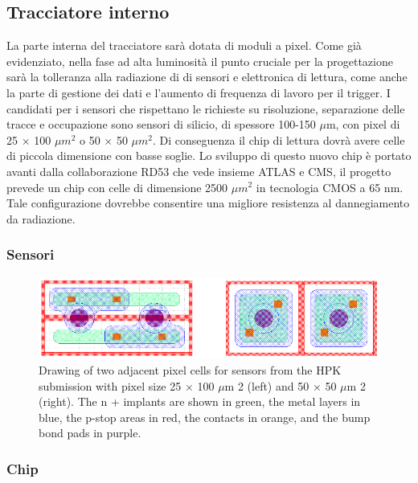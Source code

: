 \subsection{Tracciatore interno}
La parte interna del tracciatore sarà dotata di moduli a pixel. Come già evidenziato, nella fase ad alta luminosità il punto cruciale per la progettazione sarà la tolleranza alla radiazione di di sensori e elettronica di lettura, come anche la parte di gestione dei dati e l'aumento di frequenza di lavoro per il trigger. 
I candidati per i sensori che  rispettano le richieste su risoluzione, separazione delle tracce e occupazione sono sensori di silicio, di spessore 100-150 $\mu$m, con pixel di 25 $\times$ 100 $\mu m^2$ o 50 $\times$ 50 $\mu m^2$. 
Di conseguenza il chip di lettura dovrà avere celle di piccola dimensione con basse soglie. Lo sviluppo di questo nuovo chip è portato avanti dalla collaborazione RD53 che vede insieme ATLAS e CMS, il progetto prevede un chip con celle di dimensione 2500 $\mu m^2$  in tecnologia CMOS a 65 nm. 
Tale configurazione dovrebbe consentire una migliore resistenza al dannegiamento da radiazione.

\subsubsection{Sensori}
\begin{figure}
\centering
\includegraphics[scale=0.35]{Immagini/Sensors}
\caption{Drawing of two adjacent pixel cells for sensors from the HPK submission with pixel size 25 $\times$ 100 $\mu$m 2 (left) and 50 $\times$ 50 $\mu$m 2 (right). The n + implants are shown in green, the metal layers in blue, the p-stop areas in red, the contacts in orange, and the bump bond pads in purple.}
\label{Sensors}
\end{figure}

\subsubsection{Chip}

